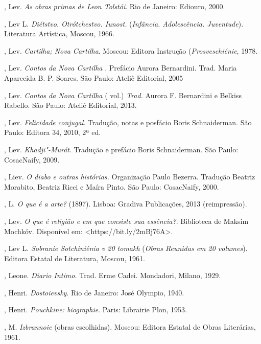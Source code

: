 , Lev. \emph{As obras primas de Leon Tolstói}. Rio de Janeiro:
Ediouro, 2000.

, Lev L. \emph{Diétstvo. Otrótchestvo.
Iunost.} (\emph{Infância. Adolescência. Juventude}). Literatura
Artística, Moscou, 1966.

, Lev. \emph{Cartilha; Nova Cartilha}. Moscou: Editora Instrução (\emph{Prosveschiénie}, 1978.

, Lev. \emph{Contos da Nova Cartilha }. Prefácio Aurora
Bernardini. Trad. Maria Aparecida B. P. Soares. São Paulo: Ateliê
Editorial, 2005

, Lev. \emph{Contos da Nova Cartilha } ( vol.) \emph{Trad.}
Aurora F. Bernardini e Belkiss Rabello. São Paulo: Ateliê Editorial,
2013.

, Lev. \emph{Felicidade conjugal}. Tradução, notas e posfácio Boris Schnaiderman. São
Paulo: Editora 34, 2010, 2ª ed.

, Lev. \emph{Khadji"-Murát}. Tradução e prefácio Boris Schnaiderman. São Paulo: CosacNaify, 2009.

, Liev. \emph{O diabo e outras histórias.} Organização Paulo Bezerra. Tradução Beatriz
Morabito, Beatriz Ricci e Maíra Pinto. São Paulo: CosacNaify, 2000.

, L. \emph{O que é a arte?} (1897). Lisboa: Gradiva Publicações, 2013 (reimpressão).

, Lev. \emph{O que é religião e em que consiste sua essência?}. Biblioteca de Maksim Mochkóv.
Disponível em: \textless{}https://bit.ly/2mBj76A\textgreater{}.

, Lev L. \emph{Sobranie Sotchiniênia v 20 tomakh} (\emph{Obras
Reunidas em 20 volumes}). Editora Estatal de Literatura, Moscou, 1961.

, Leone. \emph{Diario Intimo.} Trad. Erme Cadei. Mondadori,
Milano, 1929.

, Henri. \emph{Dostoievsky}. Rio de Janeiro: José Olympio, 1940.

, Henri. \emph{Pouchkine: biographie}. Paris: Librairie Plon,
1953.

, M. \emph{Izbrannoie} (obras escolhidas). Moscou: Editora
Estatal de Obras Literárias, 1961.

